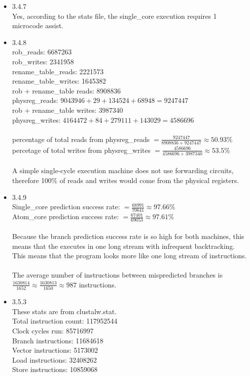 \documentclass[a4paper]{article}
\begin{document}
\begin{itemize}
\item{3.4.7} \\
Yes, according to the stats file, the single\_core execution requires 1 microcode assist.
\\

\item{3.4.8} \\
rob\_reads: 6687263 \\
rob\_writes: 2341958 \\
rename\_table\_reads: 2221573 \\
rename\_table\_writes: 1645382 \\
rob + rename\_table reads: 8908836 \\
physreg\_reads: $9043946+29+134524+68948=9247447$ \\
rob + rename\_table writes: 3987340 \\
physreg\_writes: $4164472+84+279111+143029=4586696$ \\
\\
percentage of total reads from physreg\_reads $= \frac{9247447}{8908836+9247447} \approx 50.93\%$ \\
percetage of total writes from physreg\_writes $=\frac{4586696}{4586696+3987340} \approx 53.5\%$ \\
\\
A simple single-cycle execution machine does not use forwarding circuits, therefore 100\% of reads and writes would come from the physical registers.
\\

\item{3.4.9} \\
Single\_core prediction success rate: $= \frac{68991}{70641} \approx 97.66\%$ \\
Atom\_core prediction success rate: $= \frac{67401}{69053} \approx 97.61\%$ \\
\\
Because the branch prediction success rate is so high for both machines, this means that the executes in one long stream with infrequent backtracking. This means that the program looks more like one long stream of instructions. \\
\\
The average number of instructions between mispredicted branches is \\
$\frac{1630814}{1652} \approx \frac{1630813}{1650} \approx 987$ instructions.
\\


\item{3.5.3} \\
These stats are from clustalw.stat.\\
Total instruction count: 117952544 \\
Clock cycles run: 85716997 \\
Branch instructions: 11684618 \\
Vector instructions: 5173002 \\
Load instructions: 32408262 \\
Store instructions: 10859068 \\

\end{itemize}
\end{document}
